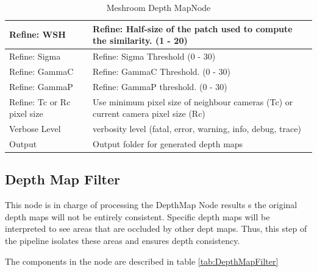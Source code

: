 \documentclass[12pt]{report}
\begin{document}
\begin{table}[H]
{\begin{tabular}{|l|l|}
    Refine: WSH                         & Refine: Half-size of the patch used to compute the similarity. (1 - 20) \\ \hline
    Refine: Sigma                       & Refine: Sigma Threshold (0 - 30)                                        \\ \hline
    Refine: GammaC                      & Refine: GammaC Threshold. (0 - 30)                                      \\ \hline
    Refine: GammaP                      & Refine: GammaP threshold. (0 - 30)                                      \\ \hline
    Refine: Tc or Rc pixel size    & Use minimum pixel size of neighbour cameras (Tc) or current camera pixel size (Rc)                                \\ \hline
    Verbose Level                       & verbosity level (fatal, error, warning, info, debug, trace)             \\ \hline
    Output                              & Output folder for generated depth maps                                  \\ \hline
    \end{tabular}%
    }
    \caption{Meshroom Depth MapNode}
    \label{tab:DepthMap}
    \end{table}
  
  

\subsection{Depth Map Filter}
This node is in charge of processing the DepthMap Node results s the original depth maps will not be entirely consistent.
Specific depth maps will be interpreted to see areas that are occluded by other dept maps. Thus, this step of the pipeline isolates these areas and ensures depth consistency.

The components in the node are described in table \ref{tab:DepthMapFilter}
\end{document}
